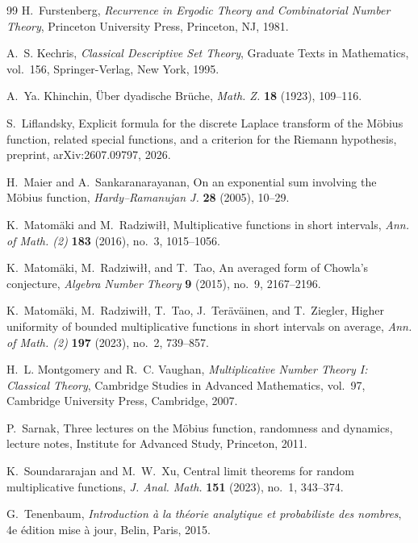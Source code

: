 \documentclass[11pt]{article}
\theoremstyle{remark}
\begin{document}
\begin{thebibliography}{99}
H.~Furstenberg,
\newblock \emph{Recurrence in Ergodic Theory and Combinatorial Number Theory},
\newblock Princeton University Press, Princeton, NJ, 1981.

A.~S. Kechris,
\newblock \emph{Classical Descriptive Set Theory},
\newblock Graduate Texts in Mathematics, vol.~156,
Springer-Verlag, New York, 1995.

A.~Ya. Khinchin,
\newblock \"Uber dyadische Br\"uche,
\newblock \emph{Math. Z.} \textbf{18} (1923), 109--116.

S.~Liflandsky,
\newblock Explicit formula for the discrete Laplace transform of the
M\"obius function, related special functions, and a criterion for the
Riemann hypothesis,
\newblock preprint, arXiv:2607.09797, 2026.

H.~Maier and A.~Sankaranarayanan,
\newblock On an exponential sum involving the M\"obius function,
\newblock \emph{Hardy--Ramanujan J.}
\textbf{28} (2005), 10--29.

K.~Matom\"aki and M.~Radziwi\l\l,
Multiplicative functions in short intervals,
\emph{Ann. of Math. (2)} \textbf{183} (2016), no.~3, 1015--1056.

K.~Matom\"aki, M.~Radziwi\l\l, and T.~Tao,
An averaged form of Chowla's conjecture,
\emph{Algebra Number Theory} \textbf{9} (2015), no.~9, 2167--2196.

K.~Matom\"aki, M.~Radziwi\l\l, T.~Tao, J.~Ter\"av\"ainen, and T.~Ziegler,
Higher uniformity of bounded multiplicative functions in short intervals on average,
\emph{Ann. of Math. (2)} \textbf{197} (2023), no.~2, 739--857.

H.~L. Montgomery and R.~C. Vaughan,
\newblock \emph{Multiplicative Number Theory I: Classical Theory},
\newblock Cambridge Studies in Advanced Mathematics, vol.~97,
Cambridge University Press, Cambridge, 2007.

P.~Sarnak,
\newblock Three lectures on the M\"obius function, randomness and dynamics,
\newblock lecture notes, Institute for Advanced Study, Princeton, 2011.

K.~Soundararajan and M.~W.~Xu,
Central limit theorems for random multiplicative functions,
\emph{J. Anal. Math.} \textbf{151} (2023), no.~1, 343--374.

G.~Tenenbaum,
\newblock \emph{Introduction \`a la th\'eorie analytique et
probabiliste des nombres},
\newblock 4e \'edition mise \`a jour, Belin, Paris, 2015.


\end{thebibliography}
\end{document}
